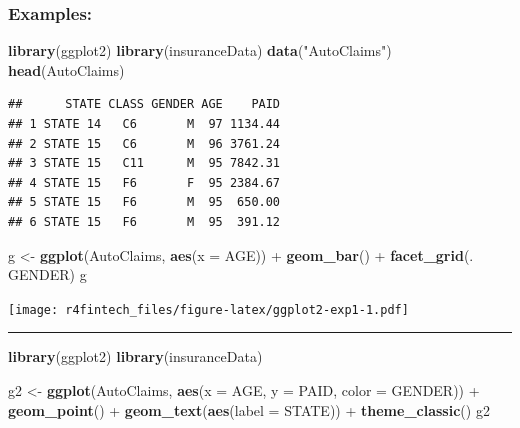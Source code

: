 \documentclass[]{book}
\newenvironment{Shaded}{\begin{snugshade}}{\end{snugshade}}
\newcommand{\KeywordTok}[1]{\textcolor[rgb]{0.13,0.29,0.53}{\textbf{{#1}}}}
\newcommand{\DataTypeTok}[1]{\textcolor[rgb]{0.13,0.29,0.53}{{#1}}}
\newcommand{\StringTok}[1]{\textcolor[rgb]{0.31,0.60,0.02}{{#1}}}
\newcommand{\NormalTok}[1]{{#1}}
\begin{document}
\subsubsection{\texorpdfstring{\textbf{Examples:}}{Examples:}}\label{examples-13}

\begin{Shaded}
\begin{Highlighting}[]
\KeywordTok{library}\NormalTok{(ggplot2)}
\KeywordTok{library}\NormalTok{(insuranceData)}
\KeywordTok{data}\NormalTok{(}\StringTok{"AutoClaims"}\NormalTok{)}
\KeywordTok{head}\NormalTok{(AutoClaims)}
\end{Highlighting}
\end{Shaded}

\begin{verbatim}
##      STATE CLASS GENDER AGE    PAID
## 1 STATE 14   C6       M  97 1134.44
## 2 STATE 15   C6       M  96 3761.24
## 3 STATE 15   C11      M  95 7842.31
## 4 STATE 15   F6       F  95 2384.67
## 5 STATE 15   F6       M  95  650.00
## 6 STATE 15   F6       M  95  391.12
\end{verbatim}

\begin{Shaded}
\begin{Highlighting}[]
\NormalTok{g <-}\StringTok{ }\KeywordTok{ggplot}\NormalTok{(AutoClaims, }\KeywordTok{aes}\NormalTok{(}\DataTypeTok{x =} \NormalTok{AGE)) +}
\StringTok{            }\KeywordTok{geom_bar}\NormalTok{() +}
\StringTok{            }\KeywordTok{facet_grid}\NormalTok{(. ~}\StringTok{ }\NormalTok{GENDER)}
\NormalTok{g}
\end{Highlighting}
\end{Shaded}

\texttt{[image: r4fintech\_files/figure-latex/ggplot2-exp1-1.pdf]}

\begin{center}\rule{0.5\linewidth}{\linethickness}\end{center}

\begin{Shaded}
\begin{Highlighting}[]
\KeywordTok{library}\NormalTok{(ggplot2)}
\KeywordTok{library}\NormalTok{(insuranceData)}


\NormalTok{g2 <-}\StringTok{ }\KeywordTok{ggplot}\NormalTok{(AutoClaims, }\KeywordTok{aes}\NormalTok{(}\DataTypeTok{x =} \NormalTok{AGE, }\DataTypeTok{y =} \NormalTok{PAID, }\DataTypeTok{color =} \NormalTok{GENDER)) +}
\StringTok{            }\KeywordTok{geom_point}\NormalTok{() +}
\StringTok{            }\KeywordTok{geom_text}\NormalTok{(}\KeywordTok{aes}\NormalTok{(}\DataTypeTok{label =} \NormalTok{STATE)) +}
\StringTok{            }\KeywordTok{theme_classic}\NormalTok{()}
\NormalTok{g2}
\end{Highlighting}
\end{Shaded}
\end{document}
